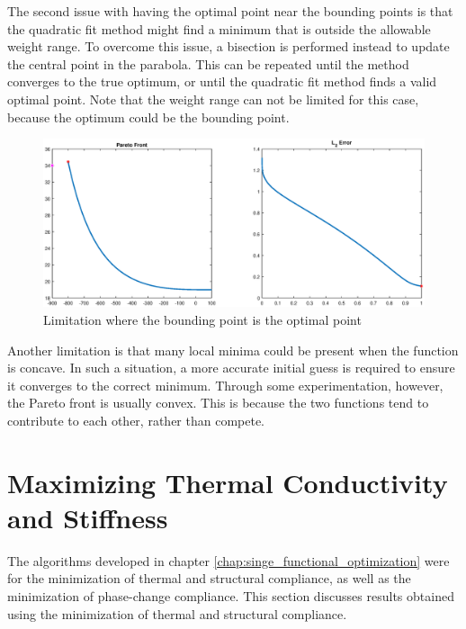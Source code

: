 The second issue with having the optimal point near the bounding points is that the quadratic fit method might find a minimum that is outside the allowable weight range. To overcome this issue, a bisection is performed instead to update the central point in the parabola. This can be repeated until the method converges to the true optimum, or until the quadratic fit method finds a valid optimal point. Note that the weight range can not be limited for this case, because the optimum could be the bounding point.

\begin{figure}[ht]
    \centering
    \includegraphics[width=0.9\linewidth]{figures/chapter_5/BoundingPointOptimum.eps}
    \caption{Limitation where the bounding point is the optimal point}
    \label{fig:optimal_point_is_bounding_point}
\end{figure}

Another limitation is that many local minima could be present when the function is concave. In such a situation, a more accurate initial guess is required to ensure it converges to the correct minimum. Through some experimentation, however, the Pareto front is usually convex. This is because the two functions tend to contribute to each other, rather than compete.


\section{Maximizing Thermal Conductivity and Stiffness}
The algorithms developed in chapter \ref{chap:singe_functional_optimization} were for the minimization of thermal and structural compliance, as well as the minimization of phase-change compliance. This section discusses results obtained using the minimization of thermal and structural compliance.

